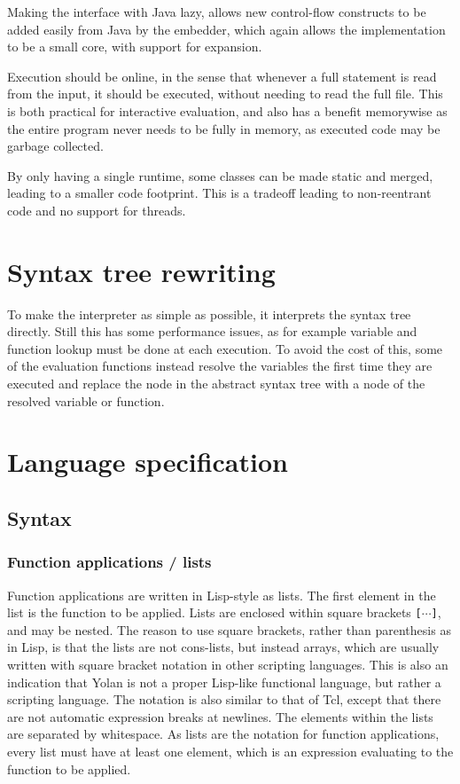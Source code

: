 \documentclass[11pt]{report}
\begin{document}
Making the interface with Java lazy, allows new control-flow constructs to be added easily from Java by the embedder, which again allows the implementation to be a small core, with support for expansion.

Execution should be online, in the sense that whenever a full statement is read from the input, it should be executed, without needing to read the full file. This is both practical for interactive evaluation, and also has a benefit memorywise as the entire program never needs to be fully in memory, as executed code may be garbage collected.

By only having a single runtime, some classes can be made static and merged, leading to a smaller code footprint. This is a tradeoff leading to non-reentrant code and no support for threads.

\section{Syntax tree rewriting}

To make the interpreter as simple as possible, it interprets the syntax tree directly. Still this has some performance issues, as for example variable and function lookup must be done at each execution. To avoid the cost of this, some of the evaluation functions instead resolve the variables the first time they are executed and replace the node in the abstract syntax tree with a node of the resolved variable or function.

\section{Language specification}

\subsection{Syntax}
\subsubsection{Function applications / lists}
Function applications are written in Lisp-style as lists. The first element in the list is the function to be applied.
Lists are enclosed within square brackets \verb|[|$\cdots$\verb|]|, and may be nested. 
The reason to use square brackets, rather than parenthesis as in Lisp, is that the lists are not cons-lists, but instead arrays, which are usually written with square bracket notation in other scripting languages. This is also an indication that Yolan is not a proper Lisp-like functional language, but rather a scripting language. The notation is also similar to that of Tcl, except that there are not automatic expression breaks at newlines.
The elements within the lists are separated by whitespace. 
As lists are the notation for function applications, every list must have at least one element, which is an expression evaluating to the function to be applied.
\end{document}
